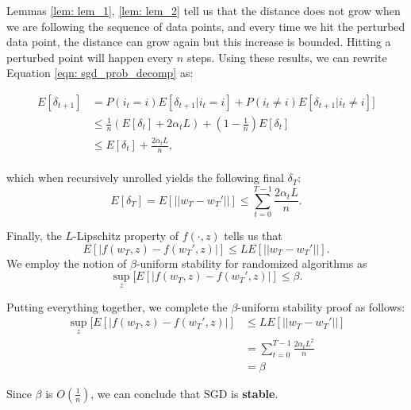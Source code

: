 \documentclass{article}
\begin{document}
Lemmas \ref{lem: lem_1}, \ref{lem: lem_2} tell us that the distance does not grow when we are following the sequence of data points, and every time we hit the perturbed data point, the distance can grow again but this increase is bounded. Hitting a perturbed point will happen every $n$ steps. Using these results, we can rewrite Equation \ref{eqn: sgd_prob_decomp} as:

\begin{align}
E[\delta_{t+1}] &= P(i_t=i)E[\delta_{t+1}|i_t=i] + P(i_t \neq i)E[\delta_{t+1}|i_t \neq i]] \\
&\leq \frac{1}{n}(E[\delta_t] + 2\alpha_t L) + \left(1 - \frac{1}{n}\right)E[\delta_t]\\
& \leq E[\delta_t] + \frac{2 \alpha_t L}{n},
\end{align}
\\
which when recursively unrolled yields the following final $\delta_T$:
\begin{equation}
    E[\delta_T] = E[|| w_T - w_T' ||] \leq  \sum_{t=0} ^ {T-1}  \frac{ 2 \alpha_t L }{n}.
\end{equation}

Finally, the $L$-Lipschitz property of $f(\cdot,z)$ tells us that
$$E[ |f(w_T, z) - f(w_T', z)|] \leq L E[|| w_T - w_T' ||].$$ We employ the notion of $\beta$-uniform stability for randomized algorithms as 
$$\sup_z[E[|f(w_T, z) - f(w_T', z)|] \leq \beta.$$

Putting everything together, we complete the $\beta$-uniform stability proof as follows:
\begin{align}
    \sup_z[E[|f(w_T, z) - f(w_T', z)|] &\leq L E[|| w_T - w_T' ||]\\
    &= \sum_{t=0} ^ {T-1}  \frac{ 2 \alpha_t L^2 }{n}\\
    &= \beta
\end{align}

Since $\beta$ is $O(\frac{1}{n})$, we can conclude that SGD is \textbf{stable}.
%
%




\end{document}
